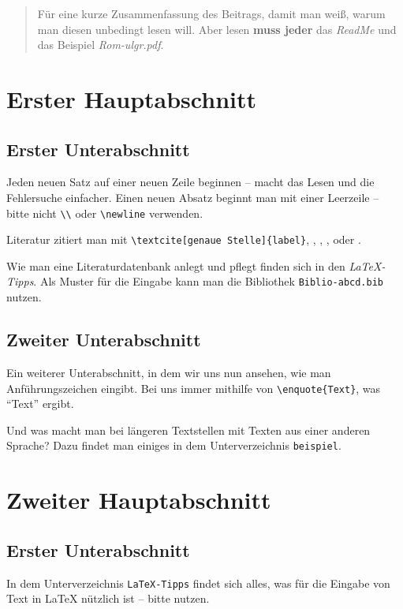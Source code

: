 \begin{quote}
Für eine kurze Zusammenfassung des Beitrags, damit man weiß, warum man
diesen unbedingt lesen will.
Aber lesen \textbf{muss jeder} das \emph{ReadMe} und das Beispiel
\emph{Rom-ulgr.pdf}.
\end{quote}
\newpage
\begin{refsection}
\section*{Erster Hauptabschnitt}
\subsection*{Erster Unterabschnitt}
Jeden neuen Satz auf einer neuen Zeile beginnen -- macht das Lesen und die Fehlersuche einfacher.
Einen neuen Absatz beginnt man mit einer Leerzeile -- bitte nicht \verb|\\| oder \verb|\newline| verwenden.

Literatur zitiert man mit \verb|\textcite[genaue Stelle]{label}|, \zB
\textcite{AlphaGo},
\textcite{alsina:2013},
\textcite[S.\,120]{heuser:2005},
\textcite{enumitem} oder \textcite{takesaki:1958}.

Wie man eine Literaturdatenbank anlegt und pflegt finden sich in den \emph{\LaTeX{}-Tipps}.
Als Muster für die Eingabe kann man die Bibliothek \texttt{Biblio-abcd.bib} nutzen.
\subsection*{Zweiter Unterabschnitt}
Ein weiterer Unterabschnitt, in dem wir uns nun ansehen, wie man Anführungszeichen eingibt.
Bei uns immer mithilfe von \verb|\enquote{Text}|, was \enquote{Text} ergibt.

Und was macht man bei längeren Textstellen mit Texten aus einer anderen Sprache?
Dazu findet man einiges in dem Unterverzeichnis \texttt{beispiel}.
\section*{Zweiter Hauptabschnitt}
\subsection*{Erster Unterabschnitt}
In dem Unterverzeichnis \texttt{LaTeX-Tipps} findet sich alles, was für die Eingabe von Text in \LaTeX{} nützlich ist -- bitte nutzen.

\end{refsection}
